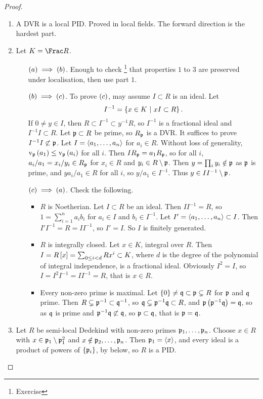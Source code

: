 \begin{proof}
\hfill
\begin{enumerate}
\item A DVR is a local PID. Proved in local fields. The forward direction is the hardest part.
\item Let $ K = \Frac R $.
\begin{itemize}[leftmargin=0.5in]
\item[$ \br{a} \implies \br{b} $.] Enough to check \footnote{Exercise} that properties $ 1 $ to $ 3 $ are preserved under localisation, then use part $ 1 $.
\item[$ \br{b} \implies \br{c} $.] To prove $ \br{c} $, may assume $ I \subset R $ is an ideal. Let
$$ I^{-1} = \cbr{x \in K \st xI \subset R}. $$
If $ 0 \ne y \in I $, then $ R \subset I^{-1} \subset y^{-1}R $, so $ I^{-1} $ is a fractional ideal and $ I^{-1}I \subset R $. Let $ \mathfrak{p} \subset R $ be prime, so $ R_{\mathfrak{p}} $ is a DVR. It suffices to prove $ I^{-1}I \not\subset \mathfrak{p} $. Let $ I = \left\langle a_1, \dots, a_n \right\rangle $ for $ a_i \in R $. Without loss of generality, $ \v_\ppp\br{a_1} \le \v_\ppp\br{a_i} $ for all $ i $. Then $ IR_{\mathfrak{p}} = a_1R_{\mathfrak{p}} $, so for all $ i $, $ a_i / a_1 = x_i / y_i \in R_{\mathfrak{p}} $ for $ x_i \in R $ and $ y_i \in R \setminus \mathfrak{p} $. Then $ y = \prod_i y_i \notin \mathfrak{p} $ as $ \mathfrak{p} $ is prime, and $ ya_i / a_1 \in R $ for all $ i $, so $ y / a_1 \in I^{-1} $. Thus $ y \in II^{-1} \setminus \mathfrak{p} $.
\item[$ \br{c} \implies \br{a} $.] Check the following.
\begin{itemize}
\item $ R $ is Noetherian. Let $ I \subset R $ be an ideal. Then $ II^{-1} = R $, so $ 1 = \sum_{i = 1}^n a_ib_i $ for $ a_i \in I $ and $ b_i \in I^{-1} $. Let $ I' = \left\langle a_1, \dots, a_n \right\rangle \subset I $. Then $ I'I^{-1} = R = II^{-1} $, so $ I' = I $. So $ I $ is finitely generated.
\item $ R $ is integrally closed. Let $ x \in K $, integral over $ R $. Then $ I = R\sbr{x} = \sum_{0 \le i < d} Rx^i \subset K $, where $ d $ is the degree of the polynomial of integral independence, is a fractional ideal. Obviously $ I^2 = I $, so $ I = I^2I^{-1} = II^{-1} = R $, that is $ x \in R $.
\item Every non-zero prime is maximal. Let $ \cbr{0} \ne \qqq \subset \ppp \subsetneq R $ for $ \mathfrak{p} $ and $ \mathfrak{q} $ prime. Then $ R \subsetneq \mathfrak{p}^{-1} \subset \mathfrak{q}^{-1} $, so $ \mathfrak{q} \subsetneq \mathfrak{p}^{-1}\mathfrak{q} \subset R $, and $ \ppp\br{\ppp^{-1}\qqq} = \qqq $, so as $ \mathfrak{q} $ is prime and $ \mathfrak{p}^{-1}\mathfrak{q} \not\subset \mathfrak{q} $, so $ \mathfrak{p} \subset \mathfrak{q} $, that is $ \mathfrak{p} = \mathfrak{q} $.
\end{itemize}
\end{itemize}

\pagebreak

\item Let $ R $ be semi-local Dedekind with non-zero primes $ \mathfrak{p}_1, \dots, \mathfrak{p}_n $. Choose $ x \in R $ with $ x \in \mathfrak{p}_1 \setminus \mathfrak{p}_1^2 $ and $ x \notin \mathfrak{p}_2, \dots, \mathfrak{p}_n $. Then $ \mathfrak{p}_1 = \left\langle x \right\rangle $, and every ideal is a product of powers of $ \cbr{\ppp_i} $, by below, so $ R $ is a PID.
\end{enumerate}
\end{proof}

